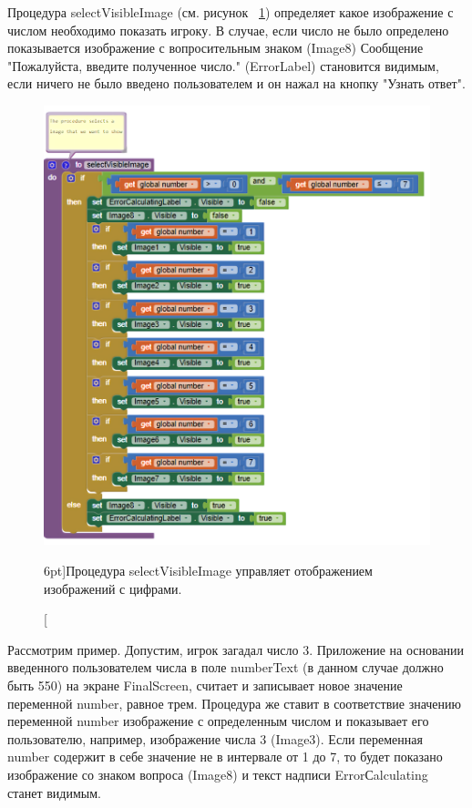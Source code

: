Процедура selectVisibleImage (см. рисунок ~\ref{fig:block:click:select:visible:image}) определяет какое изображение с числом необходимо показать игроку. В случае, если число не было определено показывается изображение с вопросительным знаком (Image8) Сообщение "Пожалуйста, введите полученное число." (ErrorLabel) становится видимым, если ничего не было введено пользователем и он нажал на кнопку "Узнать ответ".
\begin{figure}
    \includegraphics{./graphics/programs/guess_numbers/procedure_selectVisibleImage_AppInventor_2018.png}
      \caption[Процедура selectVisibleImage.][6pt]{Процедура selectVisibleImage управляет отображением изображений с цифрами.}
    \label{fig:block:click:select:visible:image}
  \end{figure}
Рассмотрим пример. Допустим, игрок загадал число 3. Приложение на основании введенного пользователем числа в поле numberText (в данном случае должно быть 550) на экране FinalScreen, считает и записывает новое значение переменной number, равное трем. Процедура же ставит в соответствие значению переменной number изображение с определенным числом и показывает его пользователю, например, изображение числа 3 (Image3). Если переменная number содержит в себе значение не в интервале от 1 до 7, то будет показано изображение со знаком вопроса (Image8) и текст надписи ErrorСalculating станет видимым.

